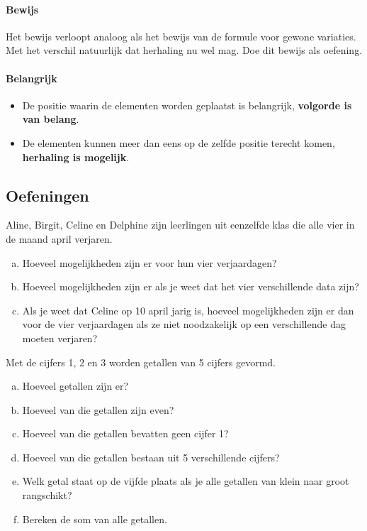 \documentclass[12pt,a4paper,twoside]{article}
\begin{document}
\paragraph*{Bewijs} Het bewijs verloopt analoog als het bewijs van de formule voor gewone variaties. Met het verschil natuurlijk dat herhaling nu wel mag. Doe dit bewijs als oefening.

\paragraph*{Belangrijk}
\begin{itemize}
  \item De positie waarin de elementen worden geplaatst is belangrijk, {\bf volgorde is van belang}.
  \item De elementen kunnen meer dan eens op de zelfde positie terecht komen, {\bf herhaling is mogelijk}.
\end{itemize}

\subsection{Oefeningen}

\begin{oefening}
Aline, Birgit, Celine en Delphine zijn leerlingen uit eenzelfde klas die alle vier in de maand april verjaren.
\begin{enumerate}[(a)]
  \item Hoeveel mogelijkheden zijn er voor hun vier verjaardagen?
  \item Hoeveel mogelijkheden zijn er als je weet dat het vier verschillende data zijn?
  \item Als je weet dat Celine op 10 april jarig is, hoeveel mogelijkheden zijn er dan voor de vier verjaardagen als ze niet noodzakelijk op een verschillende dag moeten verjaren?
\end{enumerate}
\end{oefening}

\begin{oefening}
Met de cijfers 1, 2 en 3 worden getallen van 5 cijfers gevormd.
\begin{enumerate}[(a)]
  \item Hoeveel getallen zijn er?
  \item Hoeveel van die getallen zijn even?
  \item Hoeveel van die getallen bevatten geen cijfer 1?
  \item Hoeveel van die getallen bestaan uit 5 verschillende cijfers?
  \item Welk getal staat op de vijfde plaats als je alle getallen van klein naar groot rangschikt?
  \item Bereken de som van alle getallen.
\end{enumerate}
\end{oefening}
\end{document}
